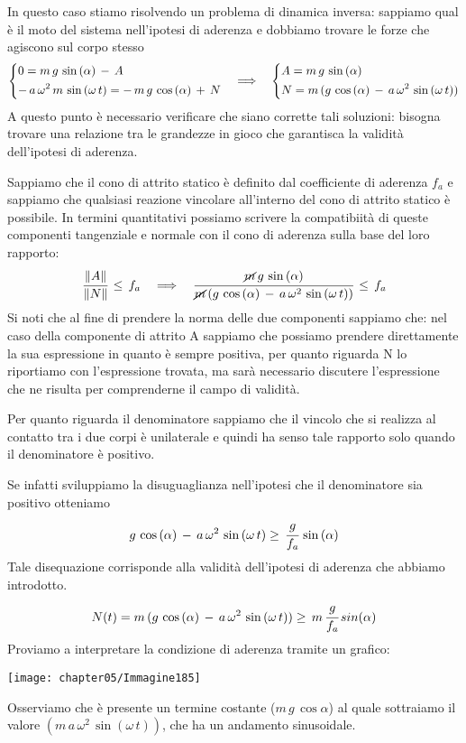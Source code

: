 In questo caso stiamo risolvendo un problema di dinamica inversa: sappiamo qual è il moto del sistema nell'ipotesi di aderenza e dobbiamo trovare le forze che agiscono sul corpo stesso
\[\begin{dcases}
0 = m\,g\,\sin{(\alpha)}\,-\,A\\
-\,a\,\omega^2\,m\,\sin{(\omega\,t)} = -\,m\,g\,\cos{(\alpha)}\,+\,N 
\end{dcases}
\quad
\Longrightarrow
\quad
\begin{dcases}
A = m\,g\,\sin{(\alpha)}\\
N = m\,(g\,\cos{(\alpha)}\,-\,a\,\omega^2\,\sin{(\omega\,t)})
\end{dcases}
\]
A questo punto è necessario verificare che siano corrette tali soluzioni: bisogna trovare una relazione tra le grandezze in gioco che garantisca la validità dell'ipotesi di aderenza.

Sappiamo che il cono di attrito statico è definito dal coefficiente di aderenza $f_a$ e sappiamo che qualsiasi reazione vincolare all'interno del cono di attrito statico è possibile. In termini quantitativi possiamo scrivere la compatibiità di queste componenti tangenziale e normale con il cono di aderenza sulla base del loro rapporto:
\[\cfrac{\lVert A\rVert}{\lVert N\rVert}\,\le\,f_a\quad\Longrightarrow\quad\cfrac{\cancel{m}\,g\,\sin{(\alpha)}}{\cancel{m}\,(g\,\cos{(\alpha)}\,-\,a\,\omega^2\,\sin{(\omega\,t)})}\,\le\,f_a\]
Si noti che al fine di prendere la norma delle due componenti sappiamo che: nel caso della componente di attrito A sappiamo che possiamo prendere direttamente la sua espressione in quanto è sempre positiva, per quanto riguarda N lo riportiamo con l'espressione trovata, ma sarà necessario discutere l'espressione che ne risulta per comprenderne il campo di validità.

Per quanto riguarda il denominatore sappiamo che il vincolo che si realizza al contatto tra i due corpi è unilaterale e quindi ha senso tale rapporto solo quando il denominatore è positivo.

Se infatti sviluppiamo la disuguaglianza nell'ipotesi che il denominatore sia positivo otteniamo
\[g\,\cos{(\alpha)}\,-\,a\,\omega^2\,\sin{(\omega\,t)} \ge\,\cfrac{g}{f_a}\,\sin{(\alpha)}\]
Tale disequazione corrisponde alla validità dell'ipotesi di aderenza che abbiamo introdotto.
\[N(t) = m\,(g\,\cos{(\alpha)}\,-\,a\,\omega^2\,\sin{(\omega\,t)})\ge\,m\,\cfrac{g}{f_a}\,sin{(\alpha)}\]
Proviamo a interpretare la condizione di aderenza tramite un grafico:
\begin{center}
\texttt{[image: chapter05/Immagine185]}
\end{center}
Osserviamo che è presente un termine costante ($m\,g\,\cos{\alpha}$) al quale sottraiamo il valore $(m\,a\,\omega^2\,\sin{(\omega\,t)})$, che ha un andamento sinusoidale.

